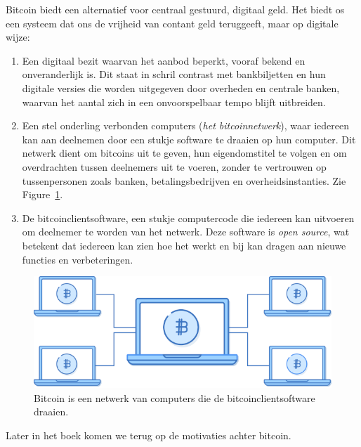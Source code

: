 \documentclass[
  letterpaper,
]{scrbook}
\begin{document}
Bitcoin biedt een alternatief voor centraal gestuurd, digitaal geld. Het
biedt os een systeem dat ons de vrijheid van contant geld teruggeeft,
maar op digitale wijze:

\begin{enumerate}
\def\labelenumi{\arabic{enumi}.}
\item
  Een digitaal bezit waarvan het aanbod beperkt, vooraf bekend en
  onveranderlijk is. Dit staat in schril contrast met bankbiljetten en
  hun digitale versies die worden uitgegeven door overheden en centrale
  banken, waarvan het aantal zich in een onvoorspelbaar tempo blijft
  uitbreiden.
\item
  Een stel onderling verbonden computers (\emph{het bitcoinnetwerk}),
  waar iedereen kan aan deelnemen door een stukje software te draaien op
  hun computer. Dit netwerk dient om bitcoins uit te geven, hun
  eigendomstitel te volgen en om overdrachten tussen deelnemers uit te
  voeren, zonder te vertrouwen op tussenpersonen zoals banken,
  betalingsbedrijven en overheidsinstanties. Zie
  Figure~\ref{fig-bitcoinnetwerk}.
\item
  De bitcoinclientsoftware, een stukje computercode die iedereen kan
  uitvoeren om deelnemer te worden van het netwerk. Deze software is
  \emph{open source}, wat betekent dat iedereen kan zien hoe het werkt
  en bij kan dragen aan nieuwe functies en verbeteringen.
\end{enumerate}

\begin{figure}

{\centering \includegraphics{./images/fig1.png}

}

\caption{\label{fig-bitcoinnetwerk}Bitcoin is een netwerk van computers
die de bitcoinclientsoftware draaien.}

\end{figure}

Later in het boek komen we terug op de motivaties achter bitcoin.
\end{document}
